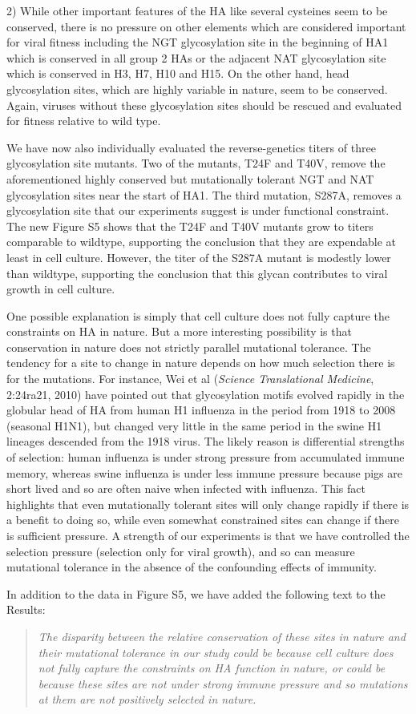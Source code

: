 \documentclass[11pt, oneside]{article}   	%
\newcommand{\response}[1]{{\color{black}#1}}
\begin{document}
2) While other important features of the HA like several cysteines seem to be conserved, there is no pressure on other elements which are considered important for viral fitness including the NGT glycosylation site in the beginning of HA1 which is conserved in all group 2 HAs or the adjacent NAT glycosylation site which is conserved in H3, H7, H10 and H15. On the other hand, head glycosylation sites, which are highly variable in nature, seem to be conserved. Again, viruses without these glycosylation sites should be rescued and evaluated for fitness relative to wild type. 

\response{We have now also individually evaluated the reverse-genetics titers of three glycosylation site mutants.
Two of the mutants, T24F and T40V, remove the aforementioned highly conserved but mutationally tolerant NGT and NAT glycosylation sites near the start of HA1.
The third mutation, S287A, removes a glycosylation site that our experiments suggest is under functional constraint.
The new Figure S5 shows that the T24F and T40V mutants grow to titers comparable to wildtype, supporting the conclusion that they are expendable at least in cell culture. 
However, the titer of the S287A mutant is modestly lower than wildtype, supporting the conclusion that this glycan contributes to viral growth in cell culture.

One possible explanation is simply that cell culture does not fully capture the constraints on HA in nature.
But a more interesting possibility is that conservation in nature does not strictly parallel mutational tolerance.
The tendency for a site to change in nature depends on how much selection there is for the mutations.
For instance, Wei et al (\textit{Science Translational Medicine}, 2:24ra21, 2010) have pointed out that glycosylation motifs evolved rapidly in the globular head of HA from human H1 influenza in the period from 1918 to 2008 (seasonal H1N1), but changed very little in the same period in the swine H1 lineages descended from the 1918 virus.
The likely reason is differential strengths of selection: human influenza is under strong pressure from accumulated immune memory, whereas swine influenza is under less immune pressure because pigs are short lived and so are often naive when infected with influenza.
This fact highlights that even mutationally tolerant sites will only change rapidly if there is a benefit to doing so, while even somewhat constrained sites can change if there is sufficient pressure.
A strength of our experiments is that we have controlled the selection pressure (selection only for viral growth), and so can measure mutational tolerance in the absence of the confounding effects of immunity.

In addition to the data in Figure S5, we have added the following text to the Results:

\begin{quote}
\textsl{
The disparity between the relative conservation of these sites in nature and their mutational tolerance in our study could be because cell culture does not fully capture the constraints on HA function in nature, or could be because these sites are not under strong immune pressure and so mutations at them are not positively selected in nature.}
\end{quote}
}
\end{document}
